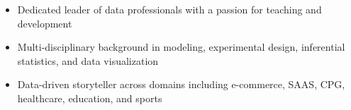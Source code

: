 \begin {cvparagraph}
\begin {itemize}
\itemsep-2mm
\vspace {1.0mm}
\item {Dedicated leader of data professionals with a passion for teaching and development}
\item {Multi-disciplinary background in modeling, experimental design, inferential statistics, and data visualization}
\item {Data-driven storyteller across domains including e-commerce, SAAS, CPG, healthcare, education, and sports}
\end {itemize}
\end {cvparagraph}
